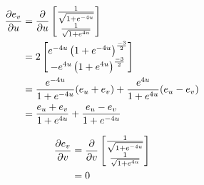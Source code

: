 \documentclass[a4paper, 11pt]{article}
\begin{document}
\begin{enumerate}[label=(\alph*)]
\begin{mdframed}
          \begin{minipage}[t]{0.5\textwidth}
            \begin{align*}
              \dfrac{\partial e_v}{\partial u} & = \dfrac{\partial}{\partial u}\begin{bmatrix}
                                    \frac{1}{\sqrt{1 + e^{-4u}}} \\
                                    \frac{1}{\sqrt{1 + e^{4u}}}
                                  \end{bmatrix}               \\
                        & =  2\begin{bmatrix}
                                e^{-4u}\left( 1+e^{-4u} \right)^{\frac{-3}2} \\
                                -e^{4u}\left( 1+e^{4u} \right)^{\frac{-3}2}
                              \end{bmatrix}       \\
                        & =
              \frac{e^{-4u}}{1+e^{-4u}}(e_u+e_v)
              +\frac{e^{4u}}{1+e^{4u}}(e_u-e_v)                                  \\
                        & = \frac{e_u+e_v}{1+e^{4u}} + \frac{e_u-e_v}{1+e^{-4u}}
            \end{align*}
          \end{minipage}\begin{minipage}[t]{0.5\textwidth}
            \begin{align*}
              \dfrac{\partial e_v}{\partial v} & = \dfrac{\partial}{\partial v}\begin{bmatrix}
                                    \frac{1}{\sqrt{1 + e^{-4u}}} \\
                                    \frac{1}{\sqrt{1 + e^{4u}}}
                                  \end{bmatrix} \\
                        & = 0\end{align*}
          \end{minipage}
        \end{mdframed}



\end{enumerate}
\end{document}
